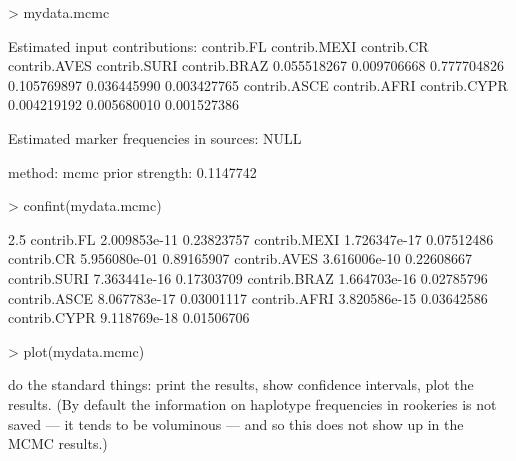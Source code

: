 \documentclass[11pt]{article}
\begin{document}
\begin{Schunk}
\begin{Sinput}
> mydata.mcmc
\end{Sinput}
\begin{Soutput}
Estimated input contributions:
  contrib.FL contrib.MEXI   contrib.CR contrib.AVES contrib.SURI contrib.BRAZ 
 0.055518267  0.009706668  0.777704826  0.105769897  0.036445990  0.003427765 
contrib.ASCE contrib.AFRI contrib.CYPR 
 0.004219192  0.005680010  0.001527386 

Estimated marker frequencies in sources:
NULL

method: mcmc 
prior strength: 0.1147742 
\end{Soutput}
\begin{Sinput}
> confint(mydata.mcmc)
\end{Sinput}
\begin{Soutput}
                     2.5%
contrib.FL   2.009853e-11 0.23823757
contrib.MEXI 1.726347e-17 0.07512486
contrib.CR   5.956080e-01 0.89165907
contrib.AVES 3.616006e-10 0.22608667
contrib.SURI 7.363441e-16 0.17303709
contrib.BRAZ 1.664703e-16 0.02785796
contrib.ASCE 8.067783e-17 0.03001117
contrib.AFRI 3.820586e-15 0.03642586
contrib.CYPR 9.118769e-18 0.01506706
\end{Soutput}
\end{Schunk}
\begin{Schunk}
\begin{Sinput}
> plot(mydata.mcmc)
\end{Sinput}
\end{Schunk}

do the standard things: print the results, show confidence
intervals, plot the results.
(By default the information on haplotype frequencies
in rookeries is not saved --- it tends to be voluminous ---
and so this does not show up in the MCMC results.)
\end{document}
